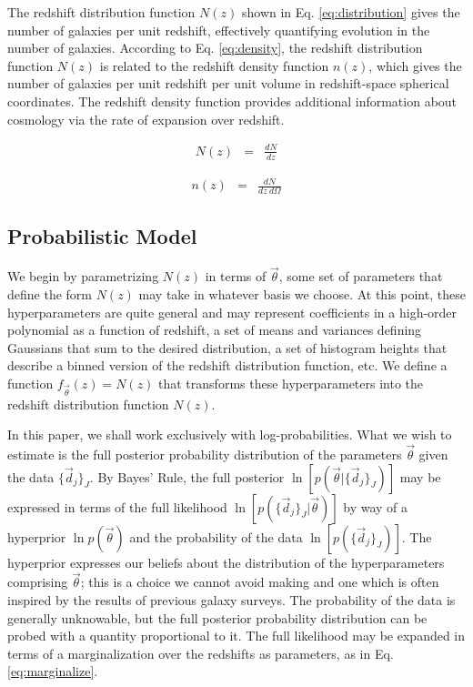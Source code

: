 \documentclass[preprint]{aastex}
\begin{document}
The redshift distribution function $N(z)$ shown in Eq. \ref{eq:distribution} 
gives the number of galaxies per unit redshift, effectively quantifying 
evolution in the number of galaxies.  \citep{Menard2013}  According to Eq. 
\ref{eq:density}, the redshift distribution function $N(z)$ is related to the 
redshift density function $n(z)$, which gives the number of galaxies per unit 
redshift per unit volume in redshift-space spherical coordinates.  The redshift 
density function provides additional information about cosmology via the rate 
of expansion over redshift.

\begin{eqnarray}
\label{eq:distribution}
N(z) &=& \frac{dN}{dz}
\end{eqnarray}

\begin{eqnarray}
\label{eq:density}
n(z) &=& \frac{dN}{dz\ d\Omega}
\end{eqnarray}

\clearpage
\subsection{Probabilistic Model}
\label{sec:prob}

We begin by parametrizing $N(z)$ in terms of $\vec{\theta}$, some set of 
parameters that define the form $N(z)$ may take in whatever basis we choose.  
At this point, these hyperparameters are quite general and may represent 
coefficients in a high-order polynomial as a function of redshift, a set of 
means and variances defining Gaussians that sum to the desired distribution, a 
set of histogram heights that describe a binned version of the redshift 
distribution function, etc.  We define a function $f_{\vec{\theta}}(z)=N(z)$ 
that transforms these hyperparameters into the redshift distribution function 
$N(z)$.

In this paper, we shall work exclusively with log-probabilities.  What we wish 
to estimate is the full posterior probability distribution of the parameters 
$\vec{\theta}$ given the data $\{\vec{d}_{j}\}_{J}$.  By Bayes' Rule, the full 
posterior $\ln[p(\vec{\theta}|\{\vec{d}_{j}\}_{J})]$ may be expressed in terms 
of the full likelihood $\ln[p(\{\vec{d}_{j}\}_{J}|\vec{\theta})]$ by way of a 
hyperprior $\ln p(\vec{\theta})$ and the probability of the data 
$\ln[p(\{\vec{d}_{j}\}_{J})]$.  The hyperprior expresses our beliefs about the 
distribution of the hyperparameters comprising $\vec{\theta}$; this is a choice 
we cannot avoid making and one which is often inspired by the results of 
previous galaxy surveys.  The probability of the data is generally unknowable, 
but the full posterior probability distribution can be probed with a quantity 
proportional to it.  The full likelihood may be expanded in terms of a 
marginalization over the redshifts as parameters, as in Eq. 
\ref{eq:marginalize}.  
\end{document}
